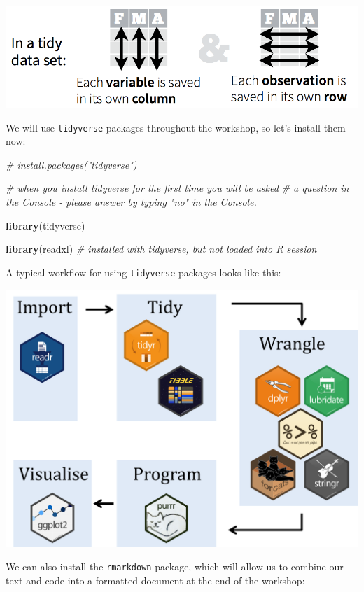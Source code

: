 \documentclass[]{book}
\newenvironment{Shaded}{\begin{snugshade}}{\end{snugshade}}
\newcommand{\CommentTok}[1]{\textcolor[rgb]{0.56,0.35,0.01}{\textit{#1}}}
\newcommand{\KeywordTok}[1]{\textcolor[rgb]{0.13,0.29,0.53}{\textbf{#1}}}
\newcommand{\NormalTok}[1]{#1}
\begin{document}
\includegraphics{R/Rintro/images/tidy_data.png}

We will use \texttt{tidyverse} packages throughout the
workshop, so let's install them now:

\begin{Shaded}
\begin{Highlighting}[]
\CommentTok{# install.packages("tidyverse")}

\CommentTok{# when you install tidyverse for the first time you will be asked}
\CommentTok{# a question in the Console - please answer by typing "no" in the Console.}

\KeywordTok{library}\NormalTok{(tidyverse)}

\KeywordTok{library}\NormalTok{(readxl) }\CommentTok{# installed with tidyverse, but not loaded into R session}
\end{Highlighting}
\end{Shaded}

A typical workflow for using \texttt{tidyverse} packages looks like this:

\includegraphics{R/Rintro/images/tidy_workflow.png}

We can also install the \texttt{rmarkdown} package, which will allow us to
combine our text and code into a formatted document at the end of
the workshop:
\end{document}
